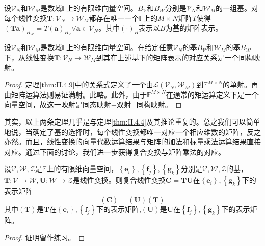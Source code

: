 \documentclass[main.tex]{subfiles}
\begin{document}
\begin{theorem}\label{thm:II.4.9}
设$\mathcal{V}_N$和$\mathcal{W}_M$是数域$\mathbb{F}$上的有限维向量空间。$B_\mathcal{V}$和$B_\mathcal{W}$分别是$\mathcal{V}_N$和$\mathcal{W}_M$的一组基。对每个线性变换$\mathbf{T}:\mathcal{V}_N\rightarrow\mathcal{W}_M$都存在唯一一个$\mathbb{F}$上的$M\times N$矩阵$T$使得$\left(\mathbf{Ta}\right)_{B_\mathcal{W}}=T\left(\mathbf{a}\right)_{B_\mathcal{V}}\forall\mathbf{a}\in\mathcal{V}_N$。其中$\left(\cdot\right)_B$表示以$B$为基的矩阵表示。
\end{theorem}

\begin{theorem}\label{thm:II.4.10}
设$\mathcal{V}_N$和$\mathcal{W}_M$是数域$\mathbb{F}$上的有限维向量空间。在给定任意$\mathcal{V}_N$的基$B_\mathcal{V}$和$\mathcal{W}_M$的基$B_\mathcal{W}$下，从线性变换$\mathbf{T}:\mathcal{V}_N\rightarrow\mathcal{W}_M$到其在上述基下的矩阵表示的对应关系是一个同构映射。
\end{theorem}
\begin{proof}
定理\ref{thm:II.4.9}中的关系式定义了一个由$\mathcal{L}\left(\mathcal{V}_N,\mathcal{W}_M\right)$到$\mathbb{F}^{M\times N}$的单射。再由矩阵运算法则易证满射。此略。此外，由于$\mathbb{F}^{M\times N}$在通常的矩运算定义下是一个向量空间，故这一映射是同态映射+双射=同构映射。
\end{proof}

其实，以上两条定理几乎是与定理\ref{thm:II.4.4}及其推论重复的。总之我们可以简单地说，当确定了基的选择时，每个线性变换都唯一对应一个相应维数的矩阵，反之亦然。而且，线性变换的向量代数运算结果与矩阵的加法和标量乘法运算结果直接对应。通过下面的讨论，我们进一步获得复合变换与矩阵乘法的对应。

\begin{theorem}\label{thm:II.4.11}
设$\mathcal{V},\mathcal{W},\mathcal{Z}$是$\mathbb{F}$上的有限维向量空间，$\left\{\mathbf{e}_i\right\},\left\{\mathbf{f}_j\right\},\left\{\mathbf{g}_k\right\}$分别是$\mathcal{V},\mathcal{W},\mathcal{Z}$的基，$\mathbf{T}:\mathcal{V}\rightarrow\mathcal{W},\mathbf{U}:\mathcal{W}\rightarrow\mathcal{Z}$是线性变换。则复合线性变换$\mathbf{C}=\mathbf{TU}$在$\left\{\mathbf{e}_i\right\},\left\{\mathbf{g}_k\right\}$下的表示矩阵
\[\left(\mathbf{C}\right)=\left(\mathbf{U}\right)\left(\mathbf{T}\right)\]
其中$\left(\mathbf{T}\right)$是$\mathbf{T}$在$\left\{\mathbf{e}_i\right\},\left\{\mathbf{f}_j\right\}$下的表示矩阵,$\left(\mathbf{U}\right)$是$\mathbf{U}$在$\left\{\mathbf{f}_j\right\},\left\{\mathbf{g}_k\right\}$下的表示矩阵。
\end{theorem}
\begin{proof}
证明留作练习。
\end{proof}
\end{document}
